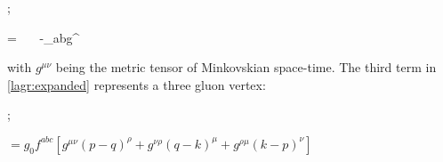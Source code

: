 \begin{minipage}{0.4\textwidth}
\begin{center}
    ; 
\end{center}
\end{minipage}
\begin{minipage}{0.58\textwidth}
        \beq \nonumber = ~~~-\delta_{ab}g^{\mu\nu} ~~~~~~~~~~~~~~~~~~~~~~~~~~~~\eeq
\end{minipage}

with $g^{\mu\nu}$ being the metric tensor of Minkovskian space-time. The third term in \cref{lagr:expanded} represents a three gluon vertex:
\begin{center}
\begin{minipage}{0.4\textwidth}
    \hspace{2cm};
\end{minipage}
\begin{minipage}{0.58\textwidth}
    $ = g_0f^{abc}\left[g^{\mu\nu}(p-q)^\rho + g^{\nu\rho}(q-k)^\mu + g^{\rho\mu}(k-p)^\nu \right] $
\end{minipage}
\end{center}

